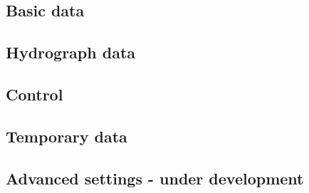     \subsection{Basic data}
    \subsection{Hydrograph data}
    
    
    \subsection{Control}
    \subsection{Temporary data}
    \subsection{Advanced settings - under development}
